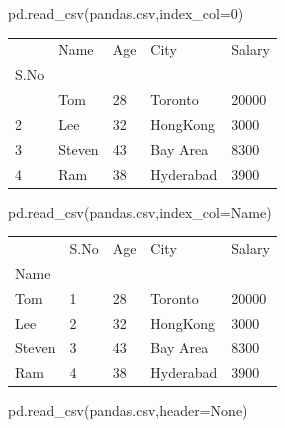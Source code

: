 \documentclass[
  a4paper,
  DIV=11,
  numbers=noendperiod]{scrreprt}
\newenvironment{Shaded}{\begin{snugshade}}{\end{snugshade}}
\newcommand{\DecValTok}[1]{\textcolor[rgb]{0.68,0.00,0.00}{#1}}
\newcommand{\NormalTok}[1]{\textcolor[rgb]{0.00,0.23,0.31}{#1}}
\newcommand{\OperatorTok}[1]{\textcolor[rgb]{0.37,0.37,0.37}{#1}}
\newcommand{\StringTok}[1]{\textcolor[rgb]{0.13,0.47,0.30}{#1}}
\newcommand{\VariableTok}[1]{\textcolor[rgb]{0.07,0.07,0.07}{#1}}
\begin{document}
\begin{Shaded}
\begin{Highlighting}[]
\NormalTok{pd.read\_csv(}\StringTok{\textquotesingle{}pandas.csv\textquotesingle{}}\NormalTok{,index\_col}\OperatorTok{=}\DecValTok{0}\NormalTok{)}
\end{Highlighting}
\end{Shaded}

\begin{longtable}[]{@{}lllll@{}}
\toprule\noalign{}
& Name & Age & City & Salary \\
S.No & & & & \\
\midrule\noalign{}
\endhead
\bottomrule\noalign{}
\endlastfoot
1 & Tom & 28 & Toronto & 20000 \\
2 & Lee & 32 & HongKong & 3000 \\
3 & Steven & 43 & Bay Area & 8300 \\
4 & Ram & 38 & Hyderabad & 3900 \\
\end{longtable}

\begin{Shaded}
\begin{Highlighting}[]
\NormalTok{pd.read\_csv(}\StringTok{\textquotesingle{}pandas.csv\textquotesingle{}}\NormalTok{,index\_col}\OperatorTok{=}\StringTok{\textquotesingle{}Name\textquotesingle{}}\NormalTok{)}
\end{Highlighting}
\end{Shaded}

\begin{longtable}[]{@{}lllll@{}}
\toprule\noalign{}
& S.No & Age & City & Salary \\
Name & & & & \\
\midrule\noalign{}
\endhead
\bottomrule\noalign{}
\endlastfoot
Tom & 1 & 28 & Toronto & 20000 \\
Lee & 2 & 32 & HongKong & 3000 \\
Steven & 3 & 43 & Bay Area & 8300 \\
Ram & 4 & 38 & Hyderabad & 3900 \\
\end{longtable}

\begin{Shaded}
\begin{Highlighting}[]
\NormalTok{pd.read\_csv(}\StringTok{\textquotesingle{}pandas.csv\textquotesingle{}}\NormalTok{,header}\OperatorTok{=}\VariableTok{None}\NormalTok{)}
\end{Highlighting}
\end{Shaded}
\end{document}
